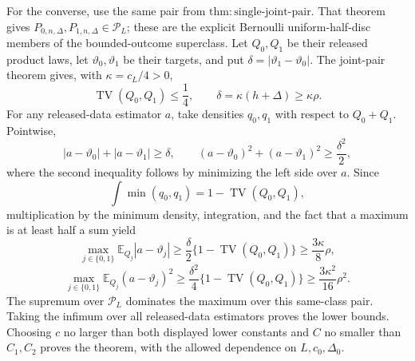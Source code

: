 For the converse, use the same pair from \(\mathrm{thm:single\text{-}joint\text{-}pair}\).  That theorem gives \(P_{0,n,\Delta},P_{1,n,\Delta}\in\mathcal P_L\); these are the explicit Bernoulli uniform-half-disc members of the bounded-outcome superclass.  Let \(Q_0,Q_1\) be their released product laws, let \(\vartheta_0,\vartheta_1\) be their targets, and put \(\delta=|\vartheta_1-\vartheta_0|\).  The joint-pair theorem gives, with \(\kappa=c_L/4>0\),
\[
 \operatorname{TV}(Q_0,Q_1)\leq\frac14,
 \qquad
 \delta=\kappa(h+\Delta)\geq\kappa\rho.
\]
For any released-data estimator \(a\), take densities \(q_0,q_1\) with respect to \(Q_0+Q_1\).  Pointwise,
\[
 |a-\vartheta_0|+|a-\vartheta_1|\geq\delta,
 \qquad
 (a-\vartheta_0)^2+(a-\vartheta_1)^2\geq\frac{\delta^2}{2},
\]
where the second inequality follows by minimizing the left side over \(a\).  Since
\[
 \int\min(q_0,q_1)=1-\operatorname{TV}(Q_0,Q_1),
\]
multiplication by the minimum density, integration, and the fact that a maximum is at least half a sum yield
\[
 \max_{j\in\{0,1\}}\mathbb E_{Q_j}|a-\vartheta_j|
 \geq\frac\delta2\{1-\operatorname{TV}(Q_0,Q_1)\}
 \geq\frac{3\kappa}{8}\rho,
\]
\[
 \max_{j\in\{0,1\}}\mathbb E_{Q_j}(a-\vartheta_j)^2
 \geq\frac{\delta^2}{4}\{1-\operatorname{TV}(Q_0,Q_1)\}
 \geq\frac{3\kappa^2}{16}\rho^2.
\]
The supremum over \(\mathcal P_L\) dominates the maximum over this same-class pair.  Taking the infimum over all released-data estimators proves the lower bounds.  Choosing \(c\) no larger than both displayed lower constants and \(C\) no smaller than \(C_1,C_2\) proves the theorem, with the allowed dependence on \(L,c_0,\Delta_0\).